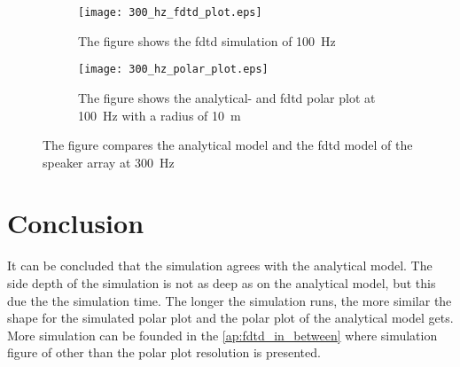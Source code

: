 \begin{figure}[H]
\centering
\begin{subfigure}[htbp]{0.55\textwidth}
		\texttt{[image: 300\_hz\_fdtd\_plot.eps]}
		\caption{The figure shows the \gls{fdtd} simulation of \SI{100}{\hertz}}
		\label{fig:fdtd_300_Hz}
\end{subfigure}
\begin{subfigure}[htbp]{0.35\textwidth}
		\texttt{[image: 300\_hz\_polar\_plot.eps]}
		\caption{The figure shows the analytical- and \gls{fdtd} polar plot at \SI{100}{\hertz} with a radius of \SI{10}{\meter}}
		\label{fig:polar_300_Hz}
\end{subfigure} 
\caption{The figure compares the analytical model and the \gls{fdtd} model of the speaker array at \SI{300}{\hertz}}
\end{figure}

\section{Conclusion}
It can be concluded that the simulation agrees with the analytical model. The side depth of the simulation is not as deep as on the analytical model, but this due the the simulation time. The longer the simulation runs, the more similar the shape for the simulated polar plot and the polar plot of the analytical model gets. More simulation can be founded in the \autoref{ap:fdtd_in_between} where simulation figure of other than the polar plot resolution is presented.


